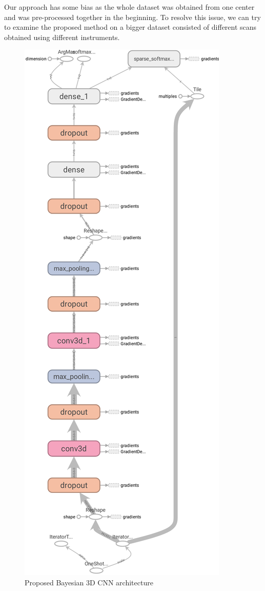 \documentclass[a4paper,fleqn]{cas-dc}
\begin{document}
Our approach has some bias as the whole dataset was obtained from one center and was pre-processed together in the beginning. To resolve this issue, we can try to examine the proposed method on a bigger dataset consisted of different scans obtained using different instruments.











\begin{figure}
	\includegraphics[width=\linewidth]{images/cnnArch}
	\caption{Proposed Bayesian 3D CNN architecture}
	\label{fig:cnnArch}
\end{figure}
\end{document}
